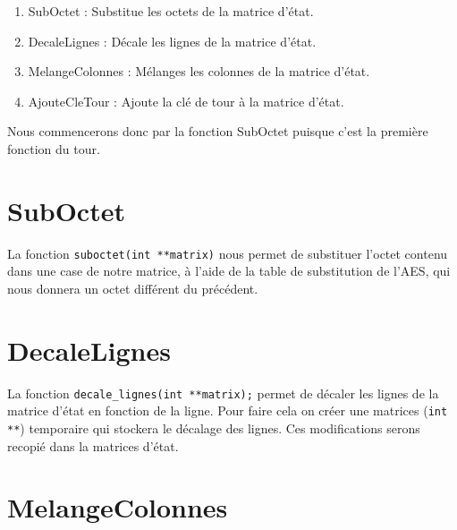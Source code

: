 \documentclass[french, 12pt]{article}
\begin{document}
	\begin{enumerate}
		\item SubOctet : Substitue les octets de la matrice d'état.
		\item DecaleLignes : Décale les lignes de la matrice d'état.
		\item MelangeColonnes : Mélanges les colonnes de la matrice d'état.
		\item AjouteCleTour : Ajoute la clé de tour à la matrice d'état.
	\end{enumerate}
  	 
	 Nous commencerons donc par la fonction SubOctet puisque c'est la première fonction du tour.
	
	\section{SubOctet}

	La fonction \verb|suboctet(int **matrix)| nous permet de substituer l'octet contenu dans une case de notre matrice, à l'aide de la table de substitution de l'AES, qui nous donnera un octet différent du précédent.
		
	\section{DecaleLignes}
	
	La fonction \verb|decale_lignes(int **matrix);| permet de décaler les lignes de la matrice d'état en fonction de la ligne. Pour faire cela on créer une matrices (\verb|int **|) temporaire qui stockera le décalage des lignes. Ces modifications serons recopié dans la matrices d'état.
	
	\section{MelangeColonnes}
	
\end{document}
